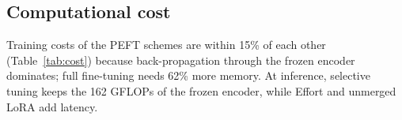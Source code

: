 \documentclass[fonts]{icst}
\begin{document}
\subsection{Computational cost}
\label{sec:cost}
Training costs of the PEFT schemes are within 15\% of each other (Table~\ref{tab:cost}) because back-propagation through the frozen encoder dominates; full fine-tuning needs 62\% more memory. At inference, selective tuning keeps the 162 GFLOPs of the frozen encoder, while Effort and unmerged LoRA add latency.

\begin{table}[!htb]
\centering
\caption{Measured cost on an NVIDIA A100-40GB (fp32, $224\times224$). Train: batch 32, forward + backward + Adam step. Infer: batch 1. Ckpt: size of the stored trainable tensors.}
\label{tab:cost}
\end{table}

\end{document}
